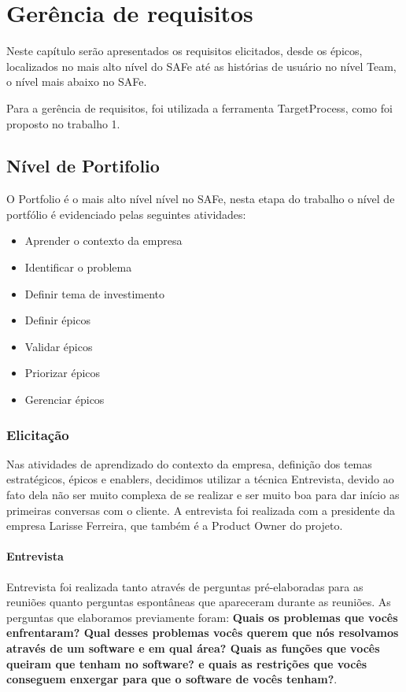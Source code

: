 \chapter{Gerência de requisitos}

  Neste capítulo serão apresentados os requisitos elicitados, desde os épicos, localizados no mais alto nível do SAFe até as
  histórias de usuário no nível Team, o nível mais abaixo no SAFe.

  Para a gerência de requisitos, foi utilizada a ferramenta TargetProcess, como foi proposto no trabalho 1.

\section{Nível de Portifolio}

  O Portfolio é o mais alto nível nível no SAFe, nesta etapa do trabalho o nível de portfólio é evidenciado pelas seguintes atividades:

  \begin{itemize}
    \item Aprender o contexto da empresa
    \item Identificar o problema
    \item Definir tema de investimento
    \item Definir épicos
    \item Validar épicos
    \item Priorizar épicos
    \item Gerenciar épicos
  \end{itemize}

\subsection{Elicitação}
  Nas atividades de aprendizado do contexto da empresa, definição dos temas estratégicos, épicos e enablers, decidimos utilizar a técnica Entrevista, devido ao fato dela não ser muito complexa de se realizar e ser muito boa para dar início as primeiras conversas com o cliente.
  A entrevista foi realizada com a presidente da empresa Larisse Ferreira, que também é a Product Owner do projeto.

\subsubsection{Entrevista}
  Entrevista foi realizada tanto através de perguntas pré-elaboradas para as reuniões quanto perguntas espontâneas que apareceram durante as
  reuniões. As perguntas que elaboramos previamente foram: \textbf{Quais os problemas que vocês enfrentaram? Qual desses problemas vocês querem
    que nós resolvamos através de um software e em qual área? Quais as funções que vocês queiram que tenham no software? e quais as restrições
  que vocês conseguem enxergar para que o software de vocês tenham?}.

